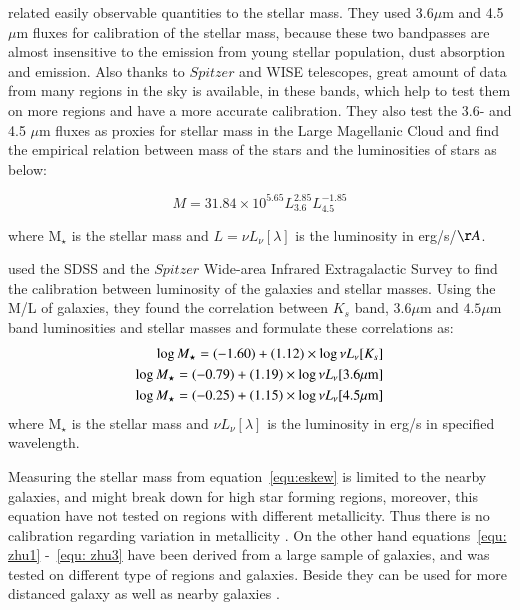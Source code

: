 \cite{Eskew12} related easily observable quantities to the stellar mass. They used 3.6$\mu$m and 4.5$\mu$m fluxes  for calibration of the stellar mass, because these two bandpasses are almost insensitive to the emission from young stellar population, dust absorption and emission. Also thanks to $Spitzer$ and WISE \citep{Wright10} telescopes, great amount of data from many regions in the sky is available, in these bands, which help to test them on more regions and have a more accurate calibration. They also test the 3.6- and 4.5 $\mu$m fluxes as proxies for stellar mass in the Large Magellanic Cloud and find the empirical relation between mass of the stars and the luminosities of stars as below:

\begin{equation}
\label{equ:eskew}
M = 31.84 \times 10^{5.65} L_{3.6}^{2.85} L_{4.5}^{-1.85}
\end{equation}

where M$_{\star}$ is the stellar mass and $L = \nu L_{\nu}[\lambda]$ is the luminosity in erg/s/$\AA$.
 
\cite{Zhu10} used the SDSS and the $Spitzer$ Wide-area Infrared Extragalactic Survey \citep[SWIRE;][] {Lonsdale03} to find the calibration between luminosity of the galaxies and stellar masses. Using the M/L of galaxies, they found the correlation between $K_s$ band, $3.6 \mu$m and $4.5 \mu$m band luminosities and stellar masses and formulate these correlations as:
\begin{align}
\label{equ: zhu1}
\log M_{\star} = (-1.60 ) + (1.12)\times \log \nu L_{\nu}[K_s]\\
\log M_{\star} = (-0.79) + (1.19)\times \log \nu L_{\nu}[3.6\mu \rm m]\\
\label{equ: zhu3}
\log M_{\star} = (-0.25) + (1.15)\times \log \nu L_{\nu}[4.5\mu \rm m] 
\end{align}
where M$_{\star}$ is the stellar mass and $ \nu L_{\nu}[\lambda]$ is the luminosity in erg/s in specified wavelength. 

Measuring the stellar mass from equation~\ref{equ:eskew} is limited to the nearby galaxies, and might break down for high star forming regions, moreover, this equation have not tested on regions with different metallicity. Thus there is no calibration regarding variation in  metallicity \citep{Eskew12}. On the other hand equations~\ref{equ: zhu1} -~\ref{equ: zhu3} have been derived from a large sample of galaxies, and was tested on different type of regions and galaxies. Beside they can be used for more distanced galaxy as well as nearby galaxies \citep{Zhu10}. 

